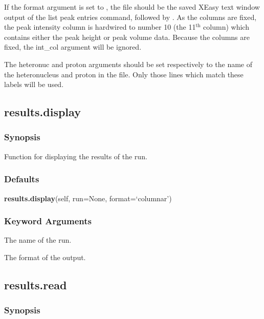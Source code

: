 If the format argument is set to , the file should be the saved XEasy text window output of the list peak entries command,  followed by .  As the columns are fixed, the peak intensity column is hardwired to number 10 (the 11$^\mathrm{th}$ column) which contains either the peak height or peak volume data.  Because the columns are fixed, the int\_col argument will be ignored.


The heteronuc and proton arguments should be set respectively to the name of the heteronucleus and proton in the file.  Only those lines which match these labels will be used.




\newpage

\subsection{results.display}


\subsubsection{Synopsis}

Function for displaying the results of the run.



\subsubsection{Defaults}

\textsf{\textbf{results.display}(self, run=None, format=`columnar')}


\subsubsection{Keyword Arguments}

  The name of the run. 

  The format of the output. 





\newpage

\subsection{results.read}


\subsubsection{Synopsis}

